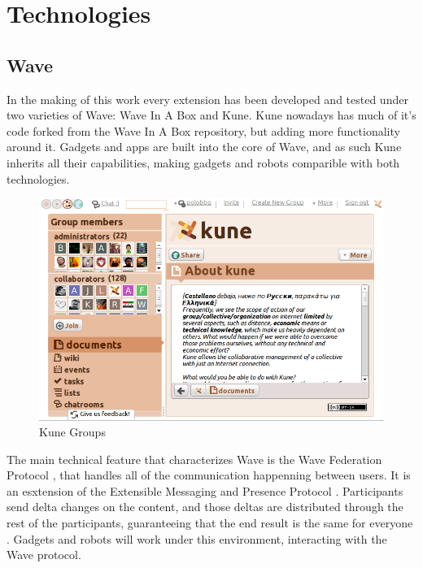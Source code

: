 \newpage
\section{Technologies}

\subsection{Wave}

In the making of this work every extension has been developed and tested under two varieties of Wave: Wave In A Box and Kune. Kune nowadays has much of it's code forked from the Wave In A Box repository, but adding more functionality around it. Gadgets and apps are built into the core of Wave, and as such Kune inherits all their capabilities, making gadgets and robots comparible with both technologies.

\begin{figure}[h]
  \center
    \includegraphics[keepaspectratio, scale=0.4]{Media/Captures/Wave/Kune_Groups.png}
  \caption{Kune Groups}
  \label{fig:kune_groups}
\end{figure}

The main technical feature that characterizes Wave is the Wave Federation Protocol \cite{ref:wave_federated_protocol}, that handles all of the communication happenning between users. It is an esxtension of the Extensible Messaging and Presence Protocol \cite{ref:xmpp}. Participants send delta changes on the content, and those deltas are distributed through the rest of the participants, guaranteeing that the end result is the same for everyone \cite{ref:federating_websites_google_wave}. Gadgets and robots will work under this environment, interacting with the Wave protocol.


